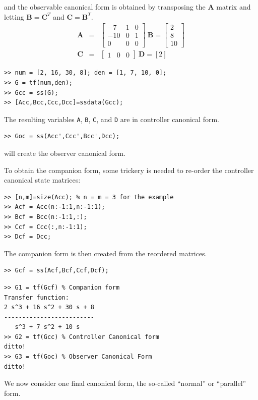 and the observable canonical form is obtained by transposing the
$\mathbf{A}$ matrix and letting $\mathbf{B} = \mathbf{C}^T$ and
$\mathbf{C}=\mathbf{B}^T$.
\begin{eqnarray*}\mathbf{A} & = & \left[\begin{array}{ccc}
  -7 & 1 & 0 \\
  -10 & 0 & 1 \\
  0 & 0 & 0
\end{array}\right]\ \mathbf{B}=\left[\begin{array}{c}
  2 \\
  8 \\
  10
\end{array}\right]\\ \mathbf{C} & = & \left[\begin{array}{ccc}
  1 & 0 & 0
\end{array}\right]\ \mathbf{D}=\left[2\right]\end{eqnarray*}
\begin{slide}\label{slide:l5s10}
\begin{verbatim}
>> num = [2, 16, 30, 8]; den = [1, 7, 10, 0];
>> G = tf(num,den);
>> Gcc = ss(G);
>> [Acc,Bcc,Ccc,Dcc]=ssdata(Gcc);
\end{verbatim}
The resulting variables \verb|A|, \verb|B|, \verb|C|, and \verb|D|
are in controller canonical form.
\begin{verbatim}
>> Goc = ss(Acc',Ccc',Bcc',Dcc);
\end{verbatim}
will create the observer canonical form.
\end{slide}
\begin{slide}\label{slide:15s10a}
To obtain the companion form,
some \Matlab{} trickery is needed to re-order the controller
canonical state matrices:
\begin{verbatim}
>> [n,m]=size(Acc); % n = m = 3 for the example
>> Acf = Acc(n:-1:1,n:-1:1);
>> Bcf = Bcc(n:-1:1,:); 
>> Ccf = Ccc(:,n:-1:1);
>> Dcf = Dcc;
\end{verbatim}
The companion form is then created from the reordered matrices.
\begin{verbatim}
>> Gcf = ss(Acf,Bcf,Ccf,Dcf);
\end{verbatim}
\end{slide}
\begin{slide}\label{slide:l5s11}
\begin{verbatim}
>> G1 = tf(Gcf) % Companion form
Transfer function:
2 s^3 + 16 s^2 + 30 s + 8
-------------------------
   s^3 + 7 s^2 + 10 s
>> G2 = tf(Gcc) % Controller Canonical form
ditto!
>> G3 = tf(Goc) % Observer Canonical Form
ditto!
\end{verbatim}
\end{slide}
We now consider one
final canonical form, the so-called ``normal'' or ``parallel''
form.

